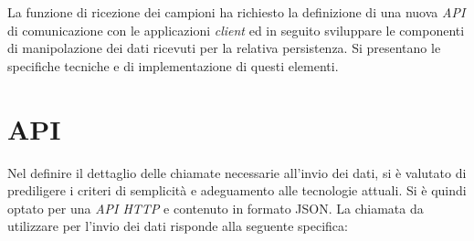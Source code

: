 La funzione di ricezione dei campioni ha richiesto la definizione di una nuova \emph{API} di comunicazione con le applicazioni \emph{client} ed in seguito sviluppare le componenti di manipolazione dei dati ricevuti per la relativa persistenza. Si presentano le specifiche tecniche e di implementazione di questi elementi.

\section{API}
Nel definire il dettaglio delle chiamate necessarie all'invio dei dati, si è valutato di prediligere i criteri di semplicità e adeguamento alle tecnologie attuali. Si è quindi optato per una \emph{API HTTP} e contenuto in formato JSON. La chiamata da utilizzare per l'invio dei dati risponde alla seguente specifica:

